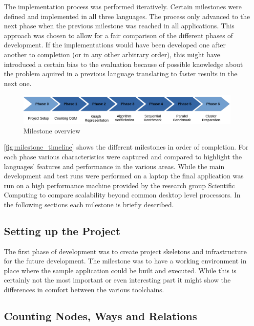The implementation process was performed iteratively. Certain milestones were defined and implemented in all three languages. The process only advanced to the next phase when the previous milestone was reached in all applications. This approach was chosen to allow for a fair comparison of the different phases of development. If the implementations would have been developed one after another to completion (or in any other arbitrary order), this might have introduced a certain bias to the evaluation because of possible knowledge about the problem aquired in a previous language translating to faster results in the next one.

\begin{figure}[htb]
    \centering
    \includegraphics[width=\textwidth]{img/milestone_timeline.png}
    \caption{Milestone overview}
    \label{fig:milestone_timeline}
\end{figure}

\autoref{fig:milestone_timeline} shows the different milestones in order of completion. For each phase various characteristics were captured and compared to highlight the languages' features and performance in the various areas. While the main development and test runs were performed on a laptop the final application was run on a high performance machine provided by the research group Scientific Computing to compare scalability beyond common desktop level processors. In the following sections each milestone is briefly described.

\subsection*{Setting up the Project}
\label{subsec:Concept::Implementation::Setup}

The first phase of development was to create project skeletons and infrastructure for the future development. The milestone was to have a working environment in place where the sample application could be built and executed. While this is certainly not the most important or even interesting part it might show the differences in comfort between the various toolchains.

\subsection*{Counting Nodes, Ways and Relations}
\label{subsec:Concept::Implementation::Counting}


